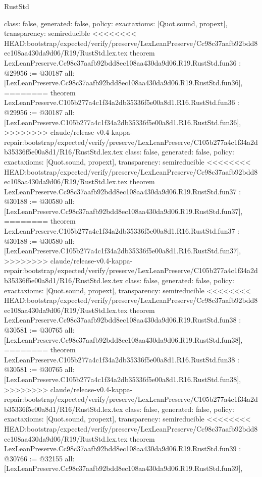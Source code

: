 \begin{lexlean}{RustStd}
\begin{coremodule}
{\begin{coremodule}
{{{{{{{{{{{{{{{{{{{{{{{{{{{{{{{{{{{{{{{  class: false,
  generated: false,
  policy: exact{axioms: [Quot.sound, propext]},
  transparency: semireducible
}
<<<<<<<< HEAD:bootstrap/expected/verify/preserve/LexLeanPreserve/Cc98c37aafb92bdd8ec108aa430da9d06/R19/RustStd.lex.tex
theorem LexLeanPreserve.Cc98c37aafb92bdd8ec108aa430da9d06.R19.RustStd.fun36 : @29956 := @30187 {
  all: [LexLeanPreserve.Cc98c37aafb92bdd8ec108aa430da9d06.R19.RustStd.fun36],
========
theorem LexLeanPreserve.C105b277a4c1f34a2db35336f5e00a8d1.R16.RustStd.fun36 : @29956 := @30187 {
  all: [LexLeanPreserve.C105b277a4c1f34a2db35336f5e00a8d1.R16.RustStd.fun36],
>>>>>>>> claude/release-v0.4-kappa-repair:bootstrap/expected/verify/preserve/LexLeanPreserve/C105b277a4c1f34a2db35336f5e00a8d1/R16/RustStd.lex.tex
  class: false,
  generated: false,
  policy: exact{axioms: [Quot.sound, propext]},
  transparency: semireducible
}
<<<<<<<< HEAD:bootstrap/expected/verify/preserve/LexLeanPreserve/Cc98c37aafb92bdd8ec108aa430da9d06/R19/RustStd.lex.tex
theorem LexLeanPreserve.Cc98c37aafb92bdd8ec108aa430da9d06.R19.RustStd.fun37 : @30188 := @30580 {
  all: [LexLeanPreserve.Cc98c37aafb92bdd8ec108aa430da9d06.R19.RustStd.fun37],
========
theorem LexLeanPreserve.C105b277a4c1f34a2db35336f5e00a8d1.R16.RustStd.fun37 : @30188 := @30580 {
  all: [LexLeanPreserve.C105b277a4c1f34a2db35336f5e00a8d1.R16.RustStd.fun37],
>>>>>>>> claude/release-v0.4-kappa-repair:bootstrap/expected/verify/preserve/LexLeanPreserve/C105b277a4c1f34a2db35336f5e00a8d1/R16/RustStd.lex.tex
  class: false,
  generated: false,
  policy: exact{axioms: [Quot.sound, propext]},
  transparency: semireducible
}
<<<<<<<< HEAD:bootstrap/expected/verify/preserve/LexLeanPreserve/Cc98c37aafb92bdd8ec108aa430da9d06/R19/RustStd.lex.tex
theorem LexLeanPreserve.Cc98c37aafb92bdd8ec108aa430da9d06.R19.RustStd.fun38 : @30581 := @30765 {
  all: [LexLeanPreserve.Cc98c37aafb92bdd8ec108aa430da9d06.R19.RustStd.fun38],
========
theorem LexLeanPreserve.C105b277a4c1f34a2db35336f5e00a8d1.R16.RustStd.fun38 : @30581 := @30765 {
  all: [LexLeanPreserve.C105b277a4c1f34a2db35336f5e00a8d1.R16.RustStd.fun38],
>>>>>>>> claude/release-v0.4-kappa-repair:bootstrap/expected/verify/preserve/LexLeanPreserve/C105b277a4c1f34a2db35336f5e00a8d1/R16/RustStd.lex.tex
  class: false,
  generated: false,
  policy: exact{axioms: [Quot.sound, propext]},
  transparency: semireducible
}
<<<<<<<< HEAD:bootstrap/expected/verify/preserve/LexLeanPreserve/Cc98c37aafb92bdd8ec108aa430da9d06/R19/RustStd.lex.tex
theorem LexLeanPreserve.Cc98c37aafb92bdd8ec108aa430da9d06.R19.RustStd.fun39 : @30766 := @32155 {
  all: [LexLeanPreserve.Cc98c37aafb92bdd8ec108aa430da9d06.R19.RustStd.fun39],
}}}}}}}}}}}}}}}}}}}}}}}}}}}}}}}}}}}}}}}}}}
\end{coremodule}}
\end{coremodule}
\end{lexlean}
